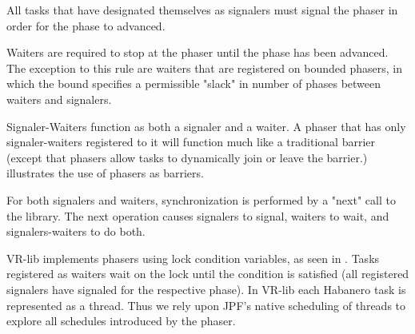All tasks that have designated themselves as signalers must signal the phaser
in order for the phase to advanced.  

Waiters are required to stop at the phaser until the phase has been advanced.
The exception to this rule are waiters that are registered on bounded phasers,
in which the bound specifies a permissible "slack" in number of phases between
waiters and signalers. 

Signaler-Waiters function as both a signaler and a waiter. A phaser that has
only signaler-waiters registered to it will function much like a traditional
barrier (except that phasers allow tasks to dynamically join or leave the
barrier.)  illustrates the use of phasers as
barriers.

For both signalers and waiters, synchronization is performed by a "next" call to
the library. The next operation causes signalers to signal, waiters to wait, and
signalers-waiters to do both.

VR-lib implements phasers using lock condition variables, as seen in
. Tasks registered as waiters wait on the lock until
the condition is satisfied (all registered signalers have signaled for the
respective phase). In VR-lib each Habanero task is represented
as a thread. Thus we rely upon JPF's native scheduling of threads to explore all
schedules introduced by the phaser.
